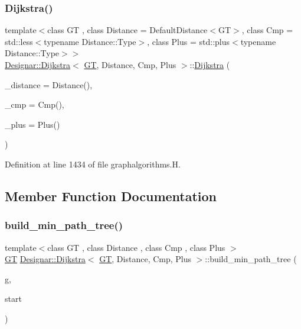 \subsubsection{\texorpdfstring{Dijkstra()}{Dijkstra()}\hspace{0.1cm}{\footnotesize\ttfamily [2/2]}}
{\footnotesize\ttfamily template$<$class GT , class Distance  = Default\+Distance$<$\+G\+T$>$, class Cmp  = std\+::less$<$typename Distance\+::\+Type$>$, class Plus  = std\+::plus$<$typename Distance\+::\+Type$>$$>$ \\
\hyperlink{class_designar_1_1_dijkstra}{Designar\+::\+Dijkstra}$<$ \hyperlink{demo-buildgraph_8_c_a3001c40d2c31ca87ed96cd7d1334a55e}{GT}, Distance, Cmp, Plus $>$\+::\hyperlink{class_designar_1_1_dijkstra}{Dijkstra} (\begin{DoxyParamCaption}\item[{Distance \&\&}]{\+\_\+distance = {\ttfamily Distance()},  }\item[{Cmp \&\&}]{\+\_\+cmp = {\ttfamily Cmp()},  }\item[{Plus \&\&}]{\+\_\+plus = {\ttfamily Plus()} }\end{DoxyParamCaption})\hspace{0.3cm}{\ttfamily [inline]}}



Definition at line 1434 of file graphalgorithms.\+H.



\subsection{Member Function Documentation}
\mbox{\label{class_designar_1_1_dijkstra_a70bbeb5dcd70c6ff3d203b7772021467}} 
\subsubsection{\texorpdfstring{build\+\_\+min\+\_\+path\+\_\+tree()}{build\_min\_path\_tree()}}
{\footnotesize\ttfamily template$<$class GT , class Distance , class Cmp , class Plus $>$ \\
\hyperlink{demo-buildgraph_8_c_a3001c40d2c31ca87ed96cd7d1334a55e}{GT} \hyperlink{class_designar_1_1_dijkstra}{Designar\+::\+Dijkstra}$<$ \hyperlink{demo-buildgraph_8_c_a3001c40d2c31ca87ed96cd7d1334a55e}{GT}, Distance, Cmp, Plus $>$\+::build\+\_\+min\+\_\+path\+\_\+tree (\begin{DoxyParamCaption}\item[{\hyperlink{demo-buildgraph_8_c_a3001c40d2c31ca87ed96cd7d1334a55e}{GT} \&}]{g,  }\item[{\hyperlink{class_designar_1_1_dijkstra_afeb644fc5395569ec366f0d220ab477d}{Node} \&}]{start }\end{DoxyParamCaption})}



